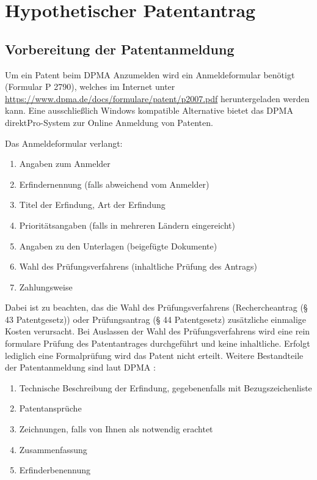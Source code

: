 \chapter{Hypothetischer Patentantrag\label{cha:chapter5}}

\section{Vorbereitung der Patentanmeldung}

Um ein Patent beim DPMA Anzumelden wird ein Anmeldeformular benötigt (Formular P 2790),
welches im Internet unter \url{https://www.dpma.de/docs/formulare/patent/p2007.pdf} heruntergeladen
werden kann. 
Eine ausschließlich Windows kompatible Alternative bietet
das DPMA direktPro-System zur Online Anmeldung von Patenten.

Das Anmeldeformular verlangt:

\begin{enumerate}
    \item Angaben zum Anmelder
    \item Erfindernennung (falls abweichend vom Anmelder)
    \item Titel der Erfindung, Art der Erfindung
    \item Prioritätsangaben (falls in mehreren Ländern eingereicht)
    \item Angaben zu den Unterlagen (beigefügte Dokumente)
    \item Wahl des Prüfungsverfahrens (inhaltliche Prüfung des Antrags)
	\item Zahlungsweise
\end{enumerate}

Dabei ist zu beachten, das die Wahl des Prüfungsverfahrens 
(Rechercheantrag (§ 43 Patentgesetz)) oder
Prüfungsantrag (§ 44 Patentgesetz) zusätzliche einmalige Kosten verursacht.
Bei Auslassen der Wahl des Prüfungsverfahrens wird eine rein formulare
Prüfung des Patentantrages durchgeführt und keine inhaltliche.
Erfolgt lediglich eine Formalprüfung wird das Patent nicht erteilt.
Weitere Bestandteile der Patentanmeldung sind laut DPMA \cite{DPMAAnmeldung}:

\begin{enumerate}
	\item Technische Beschreibung der Erfindung, gegebenenfalls mit Bezugszeichenliste
	\item Patentansprüche
	\item Zeichnungen, falls von Ihnen als notwendig erachtet
	\item Zusammenfassung
	\item Erfinderbenennung
\end{enumerate}

